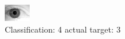 \begin{figure}[h!]
\begin{center}
\includegraphics[width=0.60\columnwidth]{figures/ID2145_class_4_target_3.png}
\end{center}
\caption{ Classification: 4 actual target: 3}
\label{fig:ID2145_class_4_target_3}
\end{figure}
